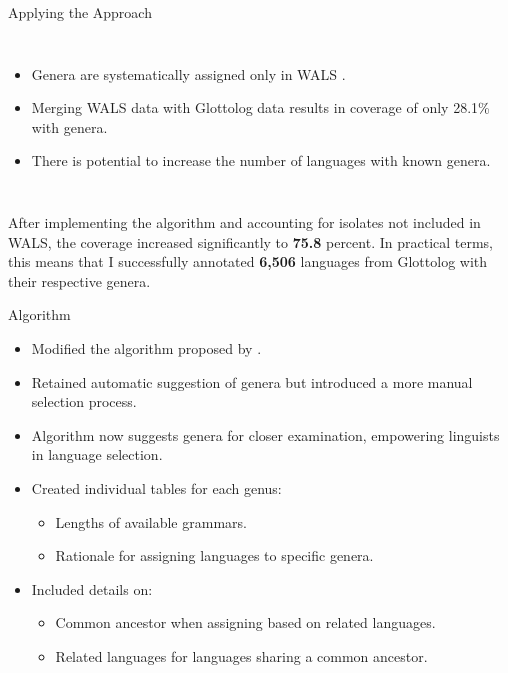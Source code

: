 \documentclass[12pt,aspectratio=169,t]{beamer}
\renewcommand{\'}{\textquotesingle}
\begin{document}
\begin{frame}{Applying the Approach}
	\begin{columns}
		\begin{itemize}
			\item Genera are systematically assigned only in WALS \citep{wals}.
			\item Merging WALS data with Glottolog data results in coverage of only 28.1\% with genera.
			\item There is potential to increase the number of languages with known genera.
		\end{itemize}
		
		\pause
		
		
	\end{columns}
	
	\pause
	
	After implementing the algorithm and accounting for isolates not included in WALS, the coverage increased significantly to \textbf{75.8} percent. In practical terms, this means that I successfully annotated \textbf{6,506} languages from Glottolog with their respective genera.
	
\end{frame}

\begin{frame}{Algorithm}
	
	\begin{itemize}
		\item Modified the algorithm proposed by \cite{cheveleva2023}.
		\item Retained automatic suggestion of genera but introduced a more manual selection process.
		\item Algorithm now suggests genera for closer examination, empowering linguists in language selection.
		\item Created individual tables for each genus:
		\begin{itemize}
			\item Lengths of available grammars.
			\item Rationale for assigning languages to specific genera.
		\end{itemize}
		\item Included details on:
		\begin{itemize}
			\item Common ancestor when assigning based on related languages.
			\item Related languages for languages sharing a common ancestor.
		\end{itemize}
	\end{itemize}
\end{frame}
\end{document}
